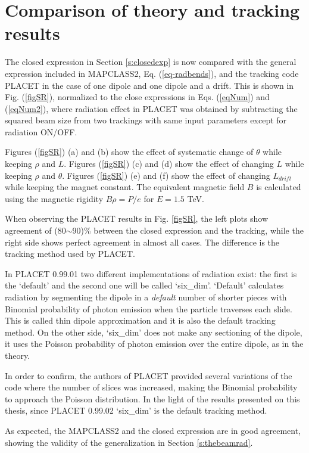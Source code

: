 \section{Comparison of theory and tracking results}\label{s:comparison}
The closed expression in Section \ref{s:closedexp} is now compared with the general expression included in MAPCLASS2, Eq. (\ref{eq-radbends}), and the tracking code PLACET in the case of one dipole and one dipole and a drift. This is shown in Fig. (\ref{figSR}), normalized to the close expressions in Eqs. (\ref{eqNum}) and (\ref{eqNum2}), where radiation effect in PLACET was obtained by subtracting the squared beam size from two trackings with same input parameters except for radiation ON/OFF.\par
Figures (\ref{figSR}) (a) and (b) show the effect of systematic change of $\theta$ while keeping $\rho$ and $L$. Figures (\ref{figSR}) (c) and (d) show the effect of changing $L$ while keeping $\rho$ and $\theta$. Figures (\ref{figSR}) (e) and (f) show the effect of changing $L_{drift}$ while keeping the magnet constant. The equivalent magnetic field $B$ is calculated using the magnetic rigidity $B\rho=P/e$ for $E=1.5 $ TeV.\par
When observing the PLACET results in Fig. \ref{figSR}, the left plots show agreement of (80$\sim$90)\% between the closed expression and the tracking, while the right side shows perfect agreement in almost all cases. The difference is the tracking method used by PLACET.\par
In PLACET 0.99.01 two different implementations of radiation exist: the first is the `default' and the second one will be called  `six\_dim'. `Default' calculates radiation by segmenting the dipole in a \emph{default} number of shorter pieces with Binomial probability of photon emission when the particle traverses each slide. This is called thin dipole approximation and it is also the default tracking method. On the other side, `six\_dim' does not make any sectioning of the dipole, it uses the Poisson probability of photon emission over the entire  dipole, as in the theory.\par
In order to confirm, the authors of PLACET provided several variations of the code where the number of slices was increased, making the Binomial probability to approach the Poisson distribution. In the light of the results presented on this thesis, since PLACET 0.99.02 `six\_dim' is the default tracking method.\par
As expected, the MAPCLASS2 and the closed expression are in good agreement, showing the validity of the generalization in Section \ref{s:thebeamrad}. %
